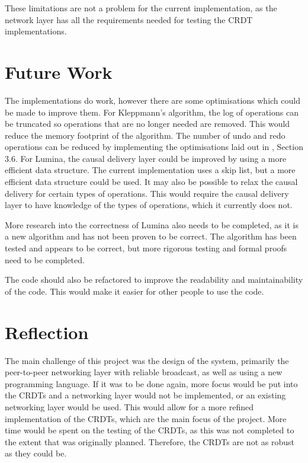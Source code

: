 \documentclass[12pt]{report}
\begin{document}
These limitations are not a problem for the current implementation, as the network layer has all the requirements needed for testing the CRDT implementations.


\section{Future Work}\label{sec:future_work}
The implementations do work, however there are some optimisations which could be made to improve them. For Kleppmann's algorithm, the log of operations can be truncated so operations that are no longer needed are removed. This would reduce the memory footprint of the algorithm. The number of undo and redo operations can be reduced by implementing the optimisations laid out in \cite{9563274}, Section 3.6. For Lumina, the causal delivery layer could be improved by using a more efficient data structure. The current implementation uses a skip list, but a more efficient data structure could be used. It may also be possible to relax the causal delivery for certain types of operations. This would require the causal delivery layer to have knowledge of the types of operations, which it currently does not. \par

More research into the correctness of Lumina also needs to be completed, as it is a new algorithm and has not been proven to be correct. The algorithm has been tested and appears to be correct, but more rigorous testing and formal proofs need to be completed. \par

The code should also be refactored to improve the readability and maintainability of the code. This would make it easier for other people to use the code. \par

\section{Reflection}
The main challenge of this project was the design of the system, primarily the peer-to-peer networking layer with reliable broadcast, as well as using a new programming language. If it was to be done again, more focus would be put into the CRDTs and a networking layer would not be implemented, or an existing networking layer would be used. This would allow for a more refined implementation of the CRDTs, which are the main focus of the project. More time would be spent on the testing of the CRDTs, as this was not completed to the extent that was originally planned. Therefore, the CRDTs are not as robust as they could be. \par
\end{document}
